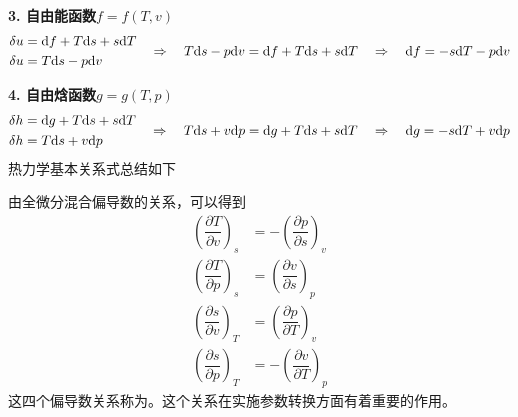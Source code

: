 \textbf{3. 自由能函数$f = f(T,v)$}
\begin{align}
	\begin{aligned}
		\delta u & = {\rm{d}} f + T {\rm{d}} s + s {\rm{d}} T\\
		\delta u &= T {\rm{d}} s - p {\rm{d}} v
	\end{aligned}
	\quad \Rightarrow \quad 
	T {\rm{d}} s  - p{\rm{d}} v = {\rm{d}} f + T {\rm{d}} s + s {\rm{d}} T
	\quad \Rightarrow \quad 
	{\rm{d}} f = - s {\rm{d}} T - p {\rm{d}} v
\end{align}

\textbf{4. 自由焓函数$g = g(T,p)$}
\begin{align}
	\begin{aligned}
		\delta h & = {\rm{d}} g + T {\rm{d}} s + s {\rm{d}} T\\
		\delta h &= T {\rm{d}} s + v {\rm{d}} p
	\end{aligned}
	\quad \Rightarrow \quad 
	T {\rm{d}} s  + v{\rm{d}} p = {\rm{d}} g + T {\rm{d}} s + s {\rm{d}} T
	\quad \Rightarrow \quad 
	{\rm{d}} g = - s {\rm{d}} T + v {\rm{d}} p
\end{align}
热力学基本关系式总结如下
\begin{table}[!htb]
	\centering{}
\end{table}

由全微分混合偏导数的关系，可以得到
\begin{align}
	\left(\dfrac{\partial T}{\partial v}\right)_s &= -\left(\dfrac{\partial p}{\partial s}\right)_v\\[0.5em]
	\left(\dfrac{\partial T}{\partial p}\right)_s &= \left(\dfrac{\partial v}{\partial s}\right)_p\\[0.5em]
	\left(\dfrac{\partial s}{\partial v}\right)_T &= \left(\dfrac{\partial p}{\partial T}\right)_v\\[0.5em]
	\left(\dfrac{\partial s}{\partial p} \right)_T &= -\left(\dfrac{\partial v}{\partial T}\right)_p
\end{align}
这四个偏导数关系称为。这个关系在实施参数转换方面有着重要的作用。

